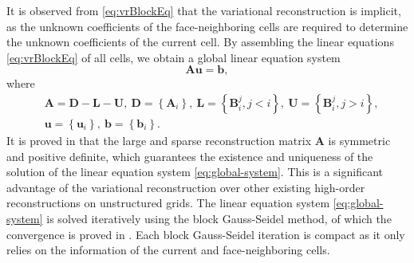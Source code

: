 It is observed from \eqref{eq:vrBlockEq} that the variational reconstruction is implicit, as the unknown coefficients of the face-neighboring cells are required to determine the unknown coefficients of the current cell.
By assembling the linear equations \eqref{eq:vrBlockEq} of all cells, we obtain a global linear equation system
\begin{equation}
    \label{eq:global-system}
    \mathbf{A} \mathbf{u} = \mathbf{b},
\end{equation}
where
\begin{equation}
    \begin{aligned}
         & \mathbf{A}= \mathbf{D} -  \mathbf{L} -  \mathbf{U},
        \ \mathbf{D}= \left\{\mathbf{A}_i\right\},
        \ \mathbf{L}= \left\{\mathbf{B}^j_i, j<i\right\},
        \ \mathbf{U}= \left\{\mathbf{B}^j_i, j>i\right\},
        \\
         & \mathbf{u}= \left\{\mathbf{u}_i\right\}, \ \mathbf{b}= \left\{\mathbf{b}_i\right\}.
    \end{aligned}
\end{equation}
It is proved in \cite{wang2017compact_VR} that the large and sparse reconstruction matrix $\mathbf{A}$ is symmetric and positive definite, which guarantees the existence and uniqueness of the solution of the linear equation system \eqref{eq:global-system}. This is a significant advantage of the variational reconstruction over other existing high-order reconstructions on unstructured grids.
The linear equation system \eqref{eq:global-system} is solved iteratively using the block Gauss-Seidel method, of which the convergence is proved in \cite{wang2017compact_VR}.
Each block Gauss-Seidel iteration is compact as it only relies on the information of the current and face-neighboring cells.

